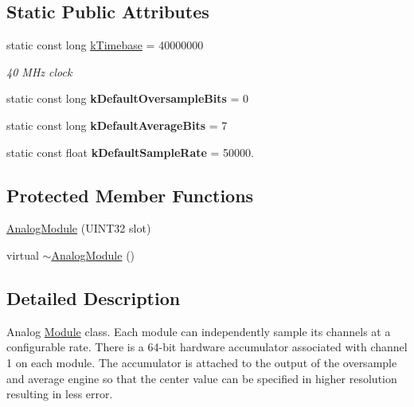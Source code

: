 \subsection*{\-Static \-Public \-Attributes}
\begin{DoxyCompactItemize}
\item 
\hypertarget{classAnalogModule_a93e13c1b5a181a92a660400c5c93c85c}{static const long \hyperlink{classAnalogModule_a93e13c1b5a181a92a660400c5c93c85c}{k\-Timebase} = 40000000}\label{classAnalogModule_a93e13c1b5a181a92a660400c5c93c85c}

\begin{DoxyCompactList}\small\item\em 40 \-M\-Hz clock \end{DoxyCompactList}\item 
\hypertarget{classAnalogModule_a2168f18fda6489141cbac5dfcd2e8343}{static const long {\bfseries k\-Default\-Oversample\-Bits} = 0}\label{classAnalogModule_a2168f18fda6489141cbac5dfcd2e8343}

\item 
\hypertarget{classAnalogModule_a0b4f6d9fd0b08bbdbce1c5abd799a67e}{static const long {\bfseries k\-Default\-Average\-Bits} = 7}\label{classAnalogModule_a0b4f6d9fd0b08bbdbce1c5abd799a67e}

\item 
\hypertarget{classAnalogModule_a0f67b2c3cd0471a85add1583ac5420e8}{static const float {\bfseries k\-Default\-Sample\-Rate} = 50000.}\label{classAnalogModule_a0f67b2c3cd0471a85add1583ac5420e8}

\end{DoxyCompactItemize}
\subsection*{\-Protected \-Member \-Functions}
\begin{DoxyCompactItemize}
\item 
\hyperlink{classAnalogModule_a8b2f5297ee8fef5bffacf1e0c0d01ea6}{\-Analog\-Module} (\-U\-I\-N\-T32 slot)
\item 
virtual \hyperlink{classAnalogModule_a480eae8e68c3e5447e423939474b607c}{$\sim$\-Analog\-Module} ()
\end{DoxyCompactItemize}


\subsection{\-Detailed \-Description}
\-Analog \hyperlink{classModule}{\-Module} class. \-Each module can independently sample its channels at a configurable rate. \-There is a 64-\/bit hardware accumulator associated with channel 1 on each module. \-The accumulator is attached to the output of the oversample and average engine so that the center value can be specified in higher resolution resulting in less error. 

